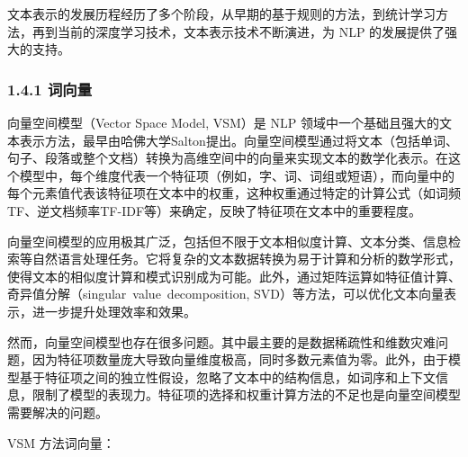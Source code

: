 \documentclass[12pt,a4paper]{book}
\begin{document}
文本表示的发展历程经历了多个阶段，从早期的基于规则的方法，到统计学习方法，再到当前的深度学习技术，文本表示技术不断演进，为
NLP 的发展提供了强大的支持。

\subsubsection{1.4.1 词向量}\label{ux8bcdux5411ux91cf}

向量空间模型（Vector Space Model, VSM）是 NLP
领域中一个基础且强大的文本表示方法，最早由哈佛大学Salton提出。向量空间模型通过将文本（包括单词、句子、段落或整个文档）转换为高维空间中的向量来实现文本的数学化表示。在这个模型中，每个维度代表一个特征项（例如，字、词、词组或短语），而向量中的每个元素值代表该特征项在文本中的权重，这种权重通过特定的计算公式（如词频TF、逆文档频率TF-IDF等）来确定，反映了特征项在文本中的重要程度。

向量空间模型的应用极其广泛，包括但不限于文本相似度计算、文本分类、信息检索等自然语言处理任务。它将复杂的文本数据转换为易于计算和分析的数学形式，使得文本的相似度计算和模式识别成为可能。此外，通过矩阵运算如特征值计算、奇异值分解（singular~value~decomposition,
SVD）等方法，可以优化文本向量表示，进一步提升处理效率和效果。

然而，向量空间模型也存在很多问题。其中最主要的是数据稀疏性和维数灾难问题，因为特征项数量庞大导致向量维度极高，同时多数元素值为零。此外，由于模型基于特征项之间的独立性假设，忽略了文本中的结构信息，如词序和上下文信息，限制了模型的表现力。特征项的选择和权重计算方法的不足也是向量空间模型需要解决的问题。

VSM 方法词向量：

\begin{Shaded}
\begin{Highlighting}[]

\OperatorTok{=}\NormalTok{ [}\NormalTok{, }\NormalTok{, }\NormalTok{, }\NormalTok{, }\NormalTok{, }\NormalTok{, }\NormalTok{, ...]}
\end{Highlighting}
\end{Shaded}
\end{document}
